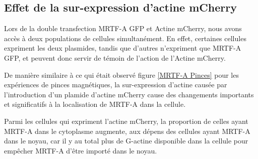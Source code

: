 \subsection{Effet de la sur-expression d'actine mCherry}

Lors de la double transfection MRTF-A GFP et Actine mCherry, nous avons accès à deux populations de cellules simultanément. En effet, certaines cellules expriment les deux plasmides, tandis que d'autres n'expriment que MRTF-A GFP, et peuvent donc servir de témoin de l'action de l'Actine mCherry. 

De manière similaire à ce qui était observé figure \ref{MRTF-A Pinces} pour les expériences de pinces magnétiques, la sur-expression d'actine causée par l'introduction d'un plamide d'actine mCherry cause des changements importants et significatifs à la localisation de MRTF-A dans la cellule. 

Parmi les cellules qui expriment l'actine mCherry, la proportion de celles ayant MRTF-A dans le cytoplasme augmente, aux dépens des cellules ayant MRTF-A dans le noyau, car il y au total plus de G-actine disponible dans la cellule pour empêcher MRTF-A d'être importé dans le noyau. 

